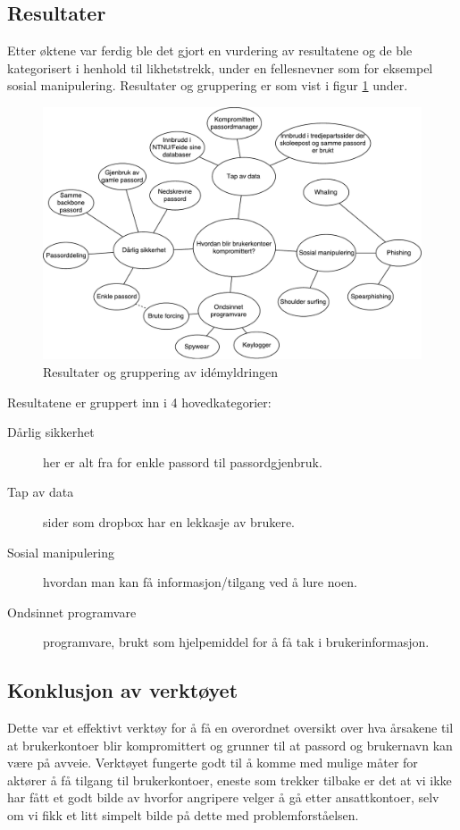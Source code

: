 \subsection{Resultater}
Etter øktene var ferdig ble det gjort en vurdering av resultatene og de ble kategorisert i henhold til likhetstrekk, under en fellesnevner som for eksempel sosial manipulering. Resultater og gruppering er som vist i figur \ref{fig:idemyldring} under.

\begin{figure}[H]
    \centering
    \includegraphics[scale=0.5]{case_2/bilder/idemyldring.pdf}
    \caption[Idémyldring]{Resultater og gruppering av idémyldringen}
    \label{fig:idemyldring}
\end{figure}

Resultatene er gruppert inn i 4 hovedkategorier:
\begin{description}
    \item [Dårlig sikkerhet] her er alt fra for enkle passord til passordgjenbruk.
    \item [Tap av data] sider som dropbox har en lekkasje av brukere.
    \item [Sosial manipulering] hvordan man kan få informasjon/tilgang ved å lure noen.
    \item [Ondsinnet programvare] programvare, brukt som hjelpemiddel for å få tak i brukerinformasjon.
\end{description}

\subsection{Konklusjon av verktøyet}
Dette var et effektivt verktøy for å få en overordnet oversikt over hva årsakene til at brukerkontoer blir kompromittert og grunner til at passord og brukernavn kan være på avveie. Verktøyet fungerte godt til å komme med mulige måter for aktører å få tilgang til brukerkontoer, eneste som trekker tilbake er det at vi ikke har fått et godt bilde av hvorfor angripere velger å gå etter ansattkontoer, selv om vi fikk et litt simpelt bilde på dette med problemforståelsen.
